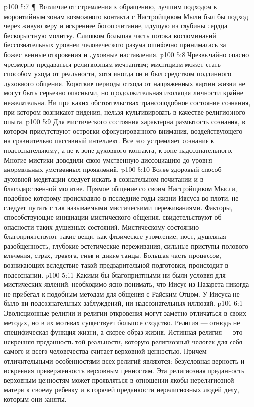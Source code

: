 \vs p100 5:7 \P\ Вотличие от стремления к обращению, лучшим подходом к моронтийным зонам возможного контакта с Настройщиком Мыли был бы подход через живую веру и искреннее богопочитание, идущую из глубины сердца бескорыстную молитву. Слишком большая часть потока воспоминаний бессознательных уровней человеческого разума ошибочно принималась за божественные откровения и духовные наставления.
\vs p100 5:8 Чрезвычайно опасно чрезмерно предаваться религиозным мечтаниям; мистицизм может стать способом ухода от реальности, хотя иногда он и был средством подлинного духовного общения. Короткие периоды отхода от напряженных картин жизни не могут быть серьезно опасными, но продолжительная изоляция личности крайне нежелательна. Ни при каких обстоятельствах трансоподобное состояние сознания, при котором возникают видения, нельзя культивировать в качестве религиозного опыта.
\vs p100 5:9 Для мистического состояния характерна размытость сознания, в котором присутствуют островки сфокусированного внимания, воздействующего на сравнительно пассивный интеллект. Все это устремляет сознание к подсознательному, а не к зоне духовного контакта, к зоне надсознательного. Многие мистики доводили свою умственную диссоциацию до уровня анормальных умственных проявлений.
\vs p100 5:10 Более здоровый способ духовной медитации следует искать в сознательном почитании и в благодарственной молитве. Прямое общение со своим Настройщиком Мысли, подобное которому происходило в последние годы жизни Иисуса во плоти, не следует путать с так называемыми мистическими переживаниями. Факторы, способствующие инициации мистического общения, свидетельствуют об опасности таких душевных состояний. Мистическому состоянию благоприятствуют такие вещи, как физическое утомление, пост, душевная разобщенность, глубокие эстетические переживания, сильные приступы полового влечения, страх, тревога, гнев и дикие танцы. Большая часть процессов, возникающих вследствие такой предварительной подготовки, происходит в подсознании.
\vs p100 5:11 Какими бы благоприятными ни были условия для мистических явлений, необходимо ясно понимать, что Иисус из Назарета никогда не прибегал к подобным методам для общения с Райским Отцом. У Иисуса не было ни подсознательных заблуждений, ни надсознательных иллюзий.
\vs p100 6:1 Эволюционные религии и религии откровения могут заметно отличаться в своих методах, но в их мотивах существует большое сходство. Религия --- отнюдь не специфическая функция жизни, а скорее образ жизни. Истинная религия --- это искренняя преданность той реальности, которую религиозный человек для себя самого и всего человечества считает верховной ценностью. Причем отличительными особенностями всех религий являются: безусловная верность и искренняя приверженность верховным ценностям. Эта религиозная преданность верховным ценностям может проявляться в отношении якобы нерелигиозной матери к своему ребенку и в горячей преданности нерелигиозных людей делу, которым они заняты.
